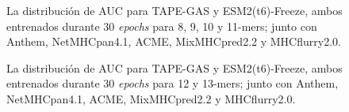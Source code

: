 \begin{figure}[H]
	
		
	\caption{
		La distribución de AUC para TAPE-GAS y ESM2(t6)-Freeze, ambos entrenados durante 30 \textit{epochs} para 8, 9, 10 y 11-mers; junto con Anthem, NetMHCpan4.1, ACME, MixMHCpred2.2 y MHCflurry2.0.}
	\label{fig:auc_distribution}
\end{figure}

\begin{figure}[H]
	\centering	

	
	\caption{
		La distribución de AUC para TAPE-GAS y ESM2(t6)-Freeze, ambos entrenados durante 30 \textit{epochs} para 12 y 13-mers; junto con Anthem, NetMHCpan4.1, ACME, MixMHCpred2.2 y MHCflurry2.0.}
	\label{fig:auc_distribution2}
\end{figure}



